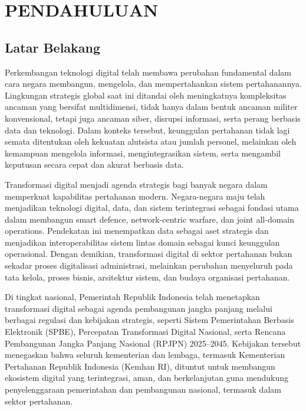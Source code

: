 \cleardoublepage %
\chapter{PENDAHULUAN}
\label{chap:pendahuluan}
\section{Latar Belakang}
Perkembangan teknologi digital telah membawa perubahan fundamental dalam cara negara membangun, mengelola, dan mempertahankan sistem pertahanannya.
Lingkungan strategis global saat ini ditandai oleh meningkatnya kompleksitas ancaman yang bersifat multidimensi, tidak hanya dalam bentuk ancaman militer konvensional, tetapi juga ancaman siber, disrupsi informasi, serta perang berbasis data dan teknologi.
Dalam konteks tersebut, keunggulan pertahanan tidak lagi semata ditentukan oleh kekuatan alutsista atau jumlah personel, melainkan oleh kemampuan mengelola informasi, mengintegrasikan sistem, serta mengambil keputusan secara cepat dan akurat berbasis data.

Transformasi digital menjadi agenda strategis bagi banyak negara dalam memperkuat kapabilitas pertahanan modern.
Negara-negara maju telah menjadikan teknologi digital, data, dan sistem terintegrasi sebagai fondasi utama dalam membangun smart defence, network-centric warfare, dan joint all-domain operations.
Pendekatan ini menempatkan data sebagai aset strategis dan menjadikan interoperabilitas sistem lintas domain sebagai kunci keunggulan operasional.
Dengan demikian, transformasi digital di sektor pertahanan bukan sekadar proses digitalisasi administrasi, melainkan perubahan menyeluruh pada tata kelola, proses bisnis, arsitektur sistem, dan budaya organisasi pertahanan.

Di tingkat nasional, Pemerintah Republik Indonesia telah menetapkan transformasi digital sebagai agenda pembangunan jangka panjang melalui berbagai regulasi dan kebijakan strategis, seperti Sistem Pemerintahan Berbasis Elektronik (SPBE), Percepatan Transformasi Digital Nasional, serta Rencana Pembangunan Jangka Panjang Nasional (RPJPN) 2025–2045.
Kebijakan tersebut menegaskan bahwa seluruh kementerian dan lembaga, termasuk Kementerian Pertahanan Republik Indonesia (Kemhan RI), dituntut untuk membangun ekosistem digital yang terintegrasi, aman, dan berkelanjutan guna mendukung penyelenggaraan pemerintahan dan pembangunan nasional, termasuk dalam sektor pertahanan.

